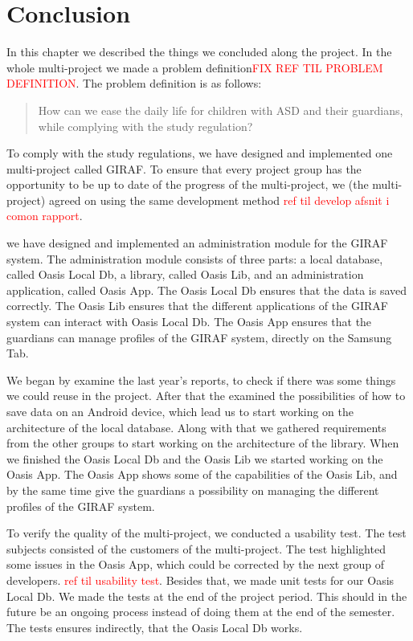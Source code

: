 \section{Conclusion}
In this chapter we described the things we concluded along the project. In the whole multi-project we made a problem definition\textcolor{red}{FIX REF TIL PROBLEM DEFINITION}. The problem definition is as follows:

\begin{quotation}
How can we ease the daily life for children with ASD and their guardians, while complying with the study regulation? 
\end{quotation}

To comply with the study regulations, we have designed and implemented one multi-project called GIRAF. To ensure that every project group has the opportunity to be up to date of the progress of the multi-project, we (the multi-project) agreed on using the same development method \textcolor{red}{ref til develop afsnit i comon rapport}.

we have designed and implemented an administration module for the GIRAF system. The administration module consists of three parts: a local database, called Oasis Local Db, a library, called Oasis Lib, and an administration application, called Oasis App.
The Oasis Local Db ensures that the data is saved correctly. The Oasis Lib ensures that the different applications of the GIRAF system can interact with Oasis Local Db. The Oasis App ensures that the guardians can manage profiles of the GIRAF system, directly on the Samsung Tab.

We began by examine the last year's reports, to check if there was some things we could reuse in the project. After that the examined the possibilities of how to save data on an Android device, which lead us to start working on the architecture of the local database. Along with that we gathered requirements from the other groups to start working on the architecture of the library. When we finished the Oasis Local Db and the Oasis Lib we started working on the Oasis App. The Oasis App shows some of the capabilities of the Oasis Lib, and by the same time give the guardians a possibility on managing the different profiles of the GIRAF system.

To verify the quality of the multi-project, we conducted a usability test. The test subjects consisted of the customers of the multi-project. The test highlighted some issues in the Oasis App, which could be corrected by the next group of developers. \textcolor{red}{ref til usability test}. Besides that, we made unit tests for our Oasis Local Db. We made the tests at the end of the project period. This should in the future be an ongoing process instead of doing them at the end of the semester. The tests ensures indirectly, that the Oasis Local Db works.